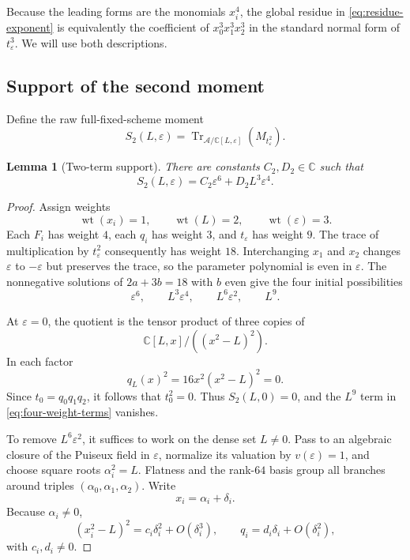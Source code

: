 \documentclass[11pt]{article}
\newtheorem{lemma}[theorem]{Lemma}
\theoremstyle{definition}
\newcommand{\C}{\mathbb C}
\newcommand{\Tr}{\operatorname{Tr}}
\begin{document}
{Because the leading forms are the monomials $x_i^4$, the global residue in \eqref{eq:residue-exponent} is equivalently the coefficient of $x_0^3x_1^3x_2^3$ in the standard normal form of $t_\varepsilon^3$. We will use both descriptions.

\subsection{Support of the second moment}

Define the raw full-fixed-scheme moment
\begin{equation}
S_2(L,\varepsilon)=\Tr_{\mathcal A/\C[L,\varepsilon]}(M_{t_\varepsilon^2}).
\label{eq:S2-deformed}
\end{equation}

\begin{lemma}[Two-term support]
\label{lem:two-term-support}
There are constants $C_2,D_2\in\C$ such that
\begin{equation}
S_2(L,\varepsilon)
=C_2\varepsilon^6+D_2L^3\varepsilon^4.
\label{eq:two-term-support}
\end{equation}
\end{lemma}

\begin{proof}
Assign weights
\[
\operatorname{wt}(x_i)=1,
\qquad
\operatorname{wt}(L)=2,
\qquad
\operatorname{wt}(\varepsilon)=3.
\]
Each $F_i$ has weight $4$, each $q_i$ has weight $3$, and $t_\varepsilon$ has weight $9$. The trace of multiplication by $t_\varepsilon^2$ consequently has weight $18$. Interchanging $x_1$ and $x_2$ changes $\varepsilon$ to $-\varepsilon$ but preserves the trace, so the parameter polynomial is even in $\varepsilon$. The nonnegative solutions of $2a+3b=18$ with $b$ even give the four initial possibilities
\begin{equation}
\varepsilon^6,
\qquad
L^3\varepsilon^4,
\qquad
L^6\varepsilon^2,
\qquad
L^9.
\label{eq:four-weight-terms}
\end{equation}

At $\varepsilon=0$, the quotient is the tensor product of three copies of
\[
\C[L,x]/((x^2-L)^2).
\]
In each factor
\[
q_L(x)^2=16x^2(x^2-L)^2=0.
\]
Since $t_0=q_0q_1q_2$, it follows that $t_0^2=0$. Thus $S_2(L,0)=0$, and the $L^9$ term in \eqref{eq:four-weight-terms} vanishes.

To remove $L^6\varepsilon^2$, it suffices to work on the dense set $L\ne0$. Pass to an algebraic closure of the Puiseux field in $\varepsilon$, normalize its valuation by $v(\varepsilon)=1$, and choose square roots $\alpha_i^2=L$. Flatness and the rank-$64$ basis group all branches around triples $(\alpha_0,\alpha_1,\alpha_2)$. Write
\[
x_i=\alpha_i+\delta_i.
\]
Because $\alpha_i\ne0$,
\begin{equation}
(x_i^2-L)^2=c_i\delta_i^2+O(\delta_i^3),
\qquad
q_i=d_i\delta_i+O(\delta_i^2),
\label{eq:local-double-expansion}
\end{equation}
with $c_i,d_i\ne0$.


\end{proof}}
\end{document}
